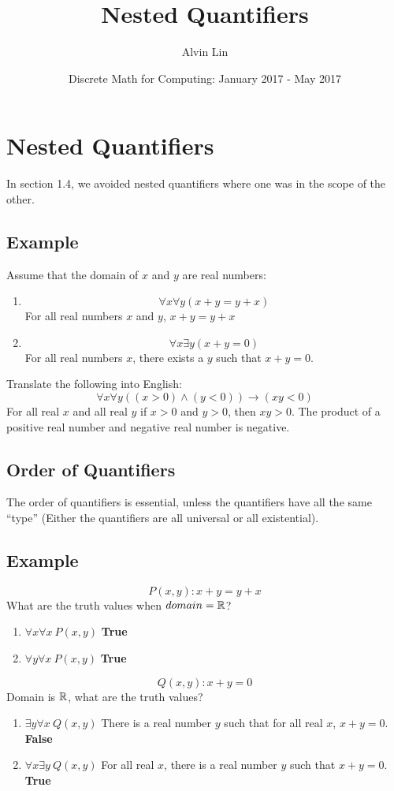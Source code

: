 \documentclass{math}
\title{Nested Quantifiers}
\author{Alvin Lin}
\date{Discrete Math for Computing: January 2017 - May 2017}
\begin{document}
\maketitle

\section*{Nested Quantifiers}
In section 1.4, we avoided nested quantifiers where one was in the scope of the
other.

\subsection*{Example}
Assume that the domain of \( x \) and \( y \) are real numbers:
\begin{enumerate}
  \item \[ \forall x \forall y (x+y = y+x) \]
  For all real numbers \( x \) and \( y \), \( x+y = y+x \)
  \item \[ \forall x \exists y (x+y = 0) \]
  For all real numbers \( x \), there exists a \( y \) such that \( x+y = 0 \).
\end{enumerate}
Translate the following into English:
\[ \forall x \forall y ((x > 0) \wedge (y < 0)) \to (xy < 0) \]
For all real \( x \) and all real \( y \) if \( x > 0 \) and \( y > 0 \), then
\( xy > 0 \). The product of a positive real number and negative real number is
negative.

\subsection*{Order of Quantifiers}
The order of quantifiers is essential, unless the quantifiers have all the same
``type'' (Either the quantifiers are all universal or all existential).

\subsection*{Example}
\[ P(x,y): x+y = y+x \]
What are the truth values when \( domain = \mathbb{R} \)?
\begin{enumerate}
  \item \( \forall{x}\forall{x}\ P(x,y) \) \textbf{True}
  \item \( \forall{y}\forall{x}\ P(x,y) \) \textbf{True}
\end{enumerate}
\[ Q(x,y): x+y = 0 \]
Domain is \( \mathbb{R} \), what are the truth values?
\begin{enumerate}
  \item \( \exists{y}\forall{x}\ Q(x,y) \) There is a real number \( y \) such
  that for all real \( x \), \( x+y = 0 \). \textbf{False}
  \item \( \forall{x}\exists{y}\ Q(x,y) \) For all real \( x \), there is a
  real number \( y \) such that \( x+y = 0 \). \textbf{True}
\end{enumerate}
\end{document}
